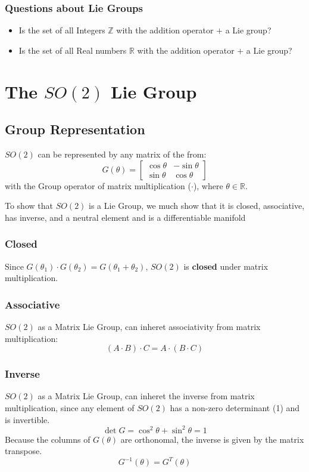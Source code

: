 \documentclass{book}
\begin{document}
\subsection*{Questions about Lie Groups}
\begin{itemize}
    \item Is the set of all Integers $\mathbb{Z}$ with the addition operator $+$ a Lie group?
    \item Is the set of all Real numbers $\mathbb{R}$ with the addition operator $+$ a Lie group?
\end{itemize}


\chapter{The $SO(2)$ Lie Group}
%
\section{Group Representation}
%
$SO(2)$ can be represented by any matrix of the from:
%
$$G(\theta) = \begin{bmatrix}
\cos{\theta} & -\sin{\theta} \\
\sin{\theta} & \cos{\theta}
\end{bmatrix}$$
with the Group operator of matrix multiplication ($\cdot$), where $\theta \in \mathbb{R}$.

To show that $SO(2)$ is a Lie Group, we much show that it is closed, associative, has inverse, and a neutral element and is a differentiable manifold

\subsection*{Closed}
%
Since $G(\theta_1) \cdot G(\theta_2) = G(\theta_1 + \theta_2)$, $SO(2)$ is \textbf{closed} under matrix multiplication.

\subsection*{Associative}
%
$SO(2)$ as a Matrix Lie Group, can inheret associativity from matrix multiplication:
%
$$(A \cdot B) \cdot C = A \cdot (B \cdot C)$$

\subsection*{Inverse}
%
$SO(2)$ as a Matrix Lie Group, can inheret the inverse from matrix multiplication, since any element of $SO(2)$ has a non-zero determinant (1) and is invertible.
%
$$\det{G} = \cos^2{\theta} + \sin^2{\theta} = 1$$
%
Because the columns of $G(\theta)$ are orthonomal, the inverse is given by the matrix transpose.
%
$$G^{-1}(\theta) = G^T(\theta)$$
\end{document}
